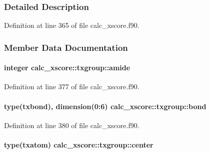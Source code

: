 \subsubsection{Detailed Description}


Definition at line 365 of file calc\-\_\-xscore.\-f90.



\subsubsection{Member Data Documentation}
\hypertarget{structcalc__xscore_1_1txgroup_a60c13a55e6e3248d12179bf283bcdc36}{
\paragraph[{amide}]{\setlength{\rightskip}{0pt plus 5cm}integer calc\-\_\-xscore\-::txgroup\-::amide}}\label{structcalc__xscore_1_1txgroup_a60c13a55e6e3248d12179bf283bcdc36}


Definition at line 377 of file calc\-\_\-xscore.\-f90.

\hypertarget{structcalc__xscore_1_1txgroup_abbbdf8d73b2d818111f88d354eef344a}{
\paragraph[{bond}]{\setlength{\rightskip}{0pt plus 5cm}type({\bf txbond}), dimension(0\-:6) calc\-\_\-xscore\-::txgroup\-::bond}}\label{structcalc__xscore_1_1txgroup_abbbdf8d73b2d818111f88d354eef344a}


Definition at line 380 of file calc\-\_\-xscore.\-f90.

\hypertarget{structcalc__xscore_1_1txgroup_a15e0502d233dd624d367cfbbe579ad6c}{
\paragraph[{center}]{\setlength{\rightskip}{0pt plus 5cm}type({\bf txatom}) calc\-\_\-xscore\-::txgroup\-::center}}\label{structcalc__xscore_1_1txgroup_a15e0502d233dd624d367cfbbe579ad6c}


